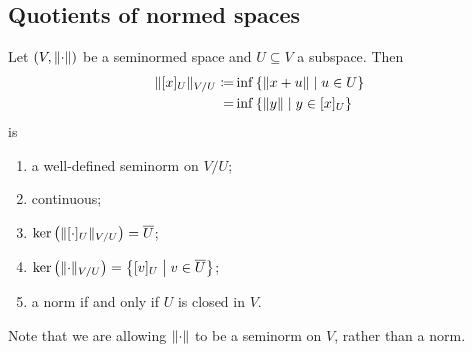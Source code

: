 \subsection{Quotients of normed spaces}
\begin{proposition} \label{quotientNormProperties}
Let $\sSet{V, \norm{\cdot}}$ be a seminormed space and $U\subseteq V$ a subspace. Then
\begin{align*}
\norm{[x]_U}_{V/U} \defeq& \inf\setbuilder{\norm{x+u}}{u\in U} \\
=& \inf\setbuilder{\norm{y}}{y\in [x]_U}
\end{align*}
is
\begin{enumerate}
\item a well-defined seminorm on $V/U$;
\item continuous;
\item $\ker\big(\lVert[\cdot]_U\rVert_{V/U}\big) = \overline{U}$;
\item $\ker\big(\norm{\cdot}_{V/U}\big) = \setbuilder{[v]_U}{v \in \overline{U}}$;
\item a norm \textup{if and only if} $U$ is closed in $V$.
\end{enumerate}
\end{proposition}
Note that we are allowing $\lVert\cdot\rVert$ to be a seminorm on $V$, rather than a norm.
